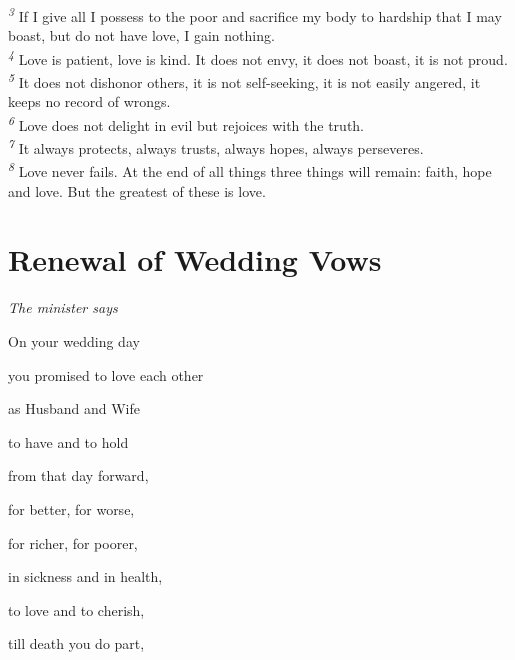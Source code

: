 \documentclass[a5paper,12pt,titlepage]{article}
\begin{document}
\textsuperscript{\em 3} If I give all I possess to the poor and sacrifice my body to hardship that I may boast, but do not have love, I gain nothing. \\[0.25em]

\textsuperscript{\em 4} Love is patient, love is kind. It does not envy, it does not boast, it is not proud. \\[0.25em] 

\textsuperscript{\em 5} It does not dishonor others, it is not self-seeking, it is not easily angered, it keeps no record of wrongs. \\[0.25em] 

\textsuperscript{\em 6} Love does not delight in evil but rejoices with the truth. \\[0.25em] 

\textsuperscript{\em 7} It always protects, always trusts, always hopes, always perseveres. \\[0.25em]

\textsuperscript{\em 8} Love never fails. At the end of all things three things will remain: faith, hope and love. But the greatest of these is love. \\[0.25em]


\clearpage 


\section{Renewal of Wedding Vows}

{\em The minister says}\\
{\bf

\hspace{2em} On your wedding day

\hspace{2em} you promised to love each other

\hspace{2em} as Husband and Wife

\hspace{2em} to have and to hold

\hspace{2em} from that day forward,

\hspace{2em} for better, for worse,

\hspace{2em} for richer, for poorer,

\hspace{2em} in sickness and in health,

\hspace{2em} to love and to cherish,

\hspace{2em} till death you do part,\\
}
\end{document}
